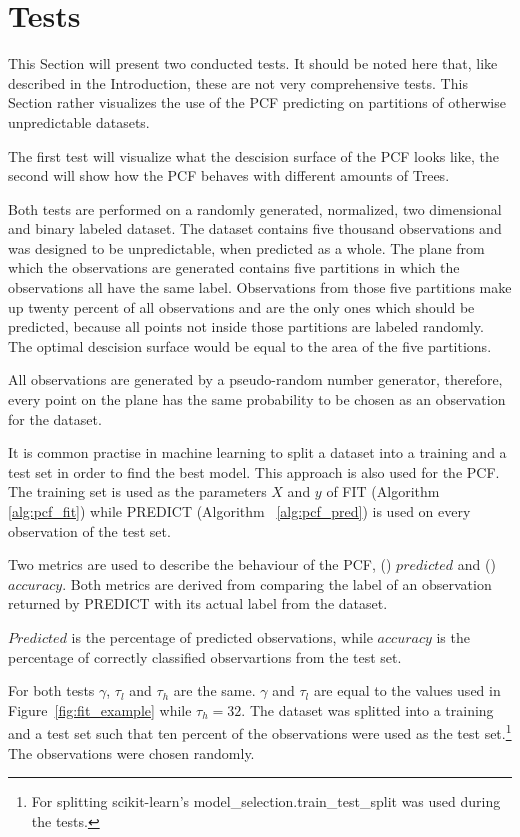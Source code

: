 \section{Tests}
\label{sec:tests}

This Section will present two conducted tests. It should
be noted here that, like described in the Introduction,
these are not very comprehensive tests. This Section rather
visualizes the use of the PCF predicting on partitions of
otherwise unpredictable datasets.

The first test will visualize what the descision surface of
the PCF looks like, the second will show how the PCF
behaves with different amounts of Trees.

Both tests are performed on a randomly generated,
normalized, two dimensional and binary labeled dataset. The
dataset contains five thousand observations and was
designed to be unpredictable, when predicted as a whole.
The plane from which the observations are generated
contains five partitions in which the observations all have
the same label. Observations from those five partitions
make up twenty percent of all observations and are the only
ones which should be predicted, because all points not
inside those partitions are labeled randomly. The optimal
descision surface would be equal to the area of the five
partitions.

All observations are generated by a pseudo-random number
generator\cite[chapter 9.6]{python}, therefore, every point
on the plane has the same probability to be chosen as an
observation for the dataset.

It is common practise in machine learning to split a
dataset into a training and a test set in order to find
the best model.\cite[chapter 18]{ki}
This approach is also used for the PCF. The training set is
used as the parameters $X$ and $y$ of FIT (Algorithm~%
\ref{alg:pcf_fit}) while PREDICT (Algorithm~%
\ref{alg:pcf_pred}) is used on every observation of the
test set.

Two metrics are used to describe the behaviour of the PCF,
() $predicted$ and ()
$accuracy$. Both metrics are derived from comparing the
label of an observation returned by PREDICT with its actual
label from the dataset.

$Predicted$ is the percentage of predicted observations,
while $accuracy$ is the percentage of correctly classified
observartions from the test set.

For both tests $\gamma$, $\tau_l$ and $\tau_h$ are the
same. $\gamma$ and $\tau_l$ are equal to the values used in
Figure~\ref{fig:fit_example} while $\tau_h = 32$. The
dataset was splitted into a training and a test set such
that ten percent of the observations were used as the test
set.\footnote{For splitting scikit-learn's
  model\_selection.train\_test\_split was used during the
  tests.\cite{sklearn_api}} The observations were chosen
randomly.

